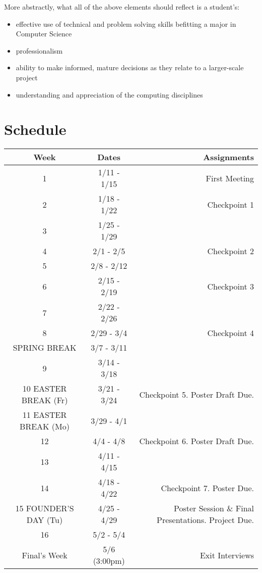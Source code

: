 \documentclass[10pt]{article}
\begin{document}
More abstractly, what all of the above elements should reflect is a student's: 
\begin{itemize}
\item effective use of technical and problem solving skills befitting a major in Computer Science
\item professionalism
\item ability to make informed, mature decisions as they relate to a larger-scale project
\item understanding and appreciation of the computing disciplines
\end{itemize}

\section{Schedule}


\begin{center}
\begin{tabular}{|c|c|r|}
\hline 
Week & Dates & Assignments \\
\hline
1 & 1/11 - 1/15 &  First Meeting\\
\hline
2 & 1/18 - 1/22 & Checkpoint 1 \\
\hline
3 & 1/25 - 1/29 &   \\
\hline
4 & 2/1 - 2/5 & Checkpoint 2  \\
\hline
5 & 2/8 - 2/12 &  \\
\hline
6 & 2/15 - 2/19 & Checkpoint 3 \\
\hline
7 & 2/22 - 2/26 &   \\
\hline
8 & 2/29 - 3/4 & Checkpoint 4  \\
\hline 
SPRING BREAK & 3/7 - 3/11 &  \\
\hline
9 & 3/14 - 3/18 &  \\
\hline
10 EASTER BREAK (Fr)& 3/21 - 3/24 & Checkpoint 5. Poster Draft Due.\\
\hline
11 EASTER BREAK (Mo)& 3/29 - 4/1 &  \\
\hline
12 & 4/4 - 4/8 & Checkpoint 6. Poster Draft Due. \\
\hline
13 & 4/11 - 4/15 &   \\
\hline
14 & 4/18 - 4/22 &  Checkpoint 7. Poster Due. \\
\hline
15 FOUNDER'S DAY (Tu) & 4/25 - 4/29 & Poster Session \& Final Presentations. Project Due.\\ 
\hline
16 & 5/2 - 5/4 & \\
\hline
Final's Week & 5/6 (3:00pm) & Exit Interviews \\ 
\hline
\end{tabular}
\end{center}
\end{document}
